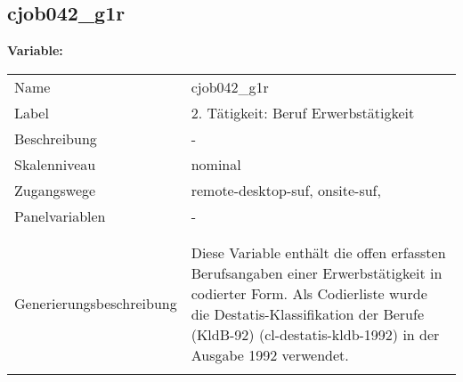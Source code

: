 	
	
	\subsection{cjob042\_g1r}
	\label{subSection:cjob042_g1r}

	\noindent\textbf{Variable:}\\
		\begin{tabular}{lL{11.3cm}}
			\label{tableVariable:cjob042_g1r}
			Name & cjob042\_g1r \\
			Label & 2. Tätigkeit: Beruf Erwerbstätigkeit \\
			Beschreibung & - \\
			Skalenniveau & nominal \\
			Zugangswege &
				remote-desktop-suf,
				onsite-suf,
 \\
			Panelvariablen & -
			 \\
			 \\
 \\
					Generierungsbeschreibung & Diese Variable enthält die offen erfassten Berufsangaben einer Erwerbstätigkeit in codierter Form. Als Codierliste wurde die Destatis-Klassifikation der Berufe (KldB-92) (cl-destatis-kldb-1992) in der Ausgabe 1992 verwendet. 
				 \\	
			 \\
		\end{tabular}






